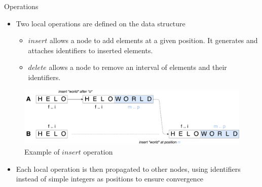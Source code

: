 \documentclass[10pt]{beamer}
\begin{document}
\begin{frame}{Operations}
  \begin{itemize}
    \item Two local operations are defined on the data structure
    \begin{itemize}
      \item $insert$ allows a node to add elements at a given position. It generates and attaches identifiers to inserted elements.
      \item $delete$ allows a node to remove an interval of elements and their identifiers.
    \end{itemize}
  \end{itemize}
  \begin{figure}
    \includegraphics[scale=0.09]{img/insert.png}
    \caption{Example of $insert$ operation}
  \end{figure}
  \begin{itemize}
    \item Each local operation is then propagated to other nodes, using identifiers instead of simple integers as positions to ensure convergence
  \end{itemize}
\end{frame}
\end{document}
